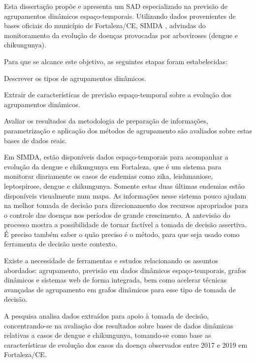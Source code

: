 
Esta dissertação propõe e apresenta um \acrshort{SAD} especializado na previsão de agrupamentos dinâmicos espaço-temporais. Utilizando dados provenientes de bases oficiais do município de Fortaleza/CE, \acrfull{SIMDA} \cite{simda}, advindas do monitoramento da evolução de doenças provocadas por arboviroses (dengue e chikungunya). 

Para que se alcance este objetivo, as seguintes etapas foram estabelecidas:

\begin{alineas}
    \item Descrever os tipos de agrupamentos dinâmicos.
	\item Extrair de características de previsão espaço-temporal sobre a evolução dos agrupamentos dinâmicos.
	\item Avaliar os resultados da metodologia de preparação de informações, parametrização e aplicação dos métodos de agrupamento são avaliados sobre estas bases de dados reais.
\end{alineas}


Em \acrshort{SIMDA}, estão disponíveis dados espaço-temporais para acompanhar a evolução da dengue e chikungunya em Fortaleza, que é um sistema para monitorar diariamente os casos de endemias como zika, leishmaniose, leptospirose, dengue e chikungunya. Somente estas duas últimas endemias estão disponíveis visualmente num mapa. As informações nesse sistema pouco ajudam na melhor tomada de decisão para direcionamento dos recursos apropriados para o controle das doenças nos períodos de grande crescimento. A antevisão do processo mostra a possibilidade de tornar factível a tomada de decisão assertiva. É preciso também saber o quão preciso é o método, para que seja usado como ferramenta de decisão neste contexto.

Existe a necessidade de ferramentas e estudos relacionando os assuntos abordados: agrupamento, previsão em dados dinâmicos espaço-temporais, grafos dinâmicos e sistemas web de forma integrada, bem como acelerar técnicas avançadas de agrupamento em grafos dinâmicos para esse tipo de tomada de decisão.

A pesquisa analisa dados extraídos para apoio à tomada de decisão, concentrando-se na avaliação dos resultados sobre bases de dados dinâmicas relativas a casos de dengue e chikungunya, tomando-se como base as características de evolução dos casos da doença observados entre 2017 e 2019 em Fortaleza/CE.

